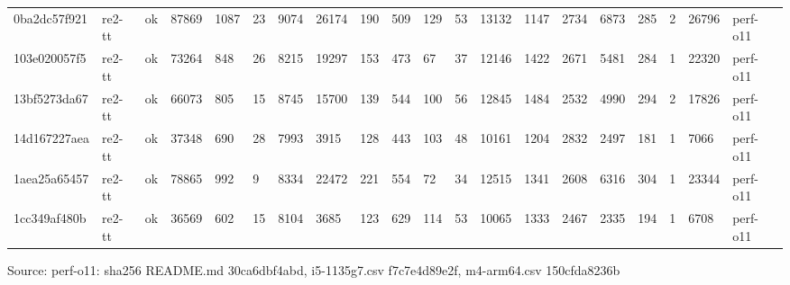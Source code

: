 \begin{table}[t]
\begin{tabular}{llllllllllllllllllll}
0ba2dc57f921 & re2-tt & ok & 87869 & 1087 & 23 & 9074 & 26174 & 190 & 509 & 129 & 53 & 13132 & 1147 & 2734 & 6873 & 285 & 2 & 26796 & perf-o11 \\
103e020057f5 & re2-tt & ok & 73264 & 848 & 26 & 8215 & 19297 & 153 & 473 & 67 & 37 & 12146 & 1422 & 2671 & 5481 & 284 & 1 & 22320 & perf-o11 \\
13bf5273da67 & re2-tt & ok & 66073 & 805 & 15 & 8745 & 15700 & 139 & 544 & 100 & 56 & 12845 & 1484 & 2532 & 4990 & 294 & 2 & 17826 & perf-o11 \\
14d167227aea & re2-tt & ok & 37348 & 690 & 28 & 7993 & 3915 & 128 & 443 & 103 & 48 & 10161 & 1204 & 2832 & 2497 & 181 & 1 & 7066 & perf-o11 \\
1aea25a65457 & re2-tt & ok & 78865 & 992 & 9 & 8334 & 22472 & 221 & 554 & 72 & 34 & 12515 & 1341 & 2608 & 6316 & 304 & 1 & 23344 & perf-o11 \\
1cc349af480b & re2-tt & ok & 36569 & 602 & 15 & 8104 & 3685 & 123 & 629 & 114 & 53 & 10065 & 1333 & 2467 & 2335 & 194 & 1 & 6708 & perf-o11 \\
\hline
\end{tabular}
\par\smallskip\footnotesize
Source: perf-o11: sha256 README.md 30ca6dbf4abd, i5-1135g7.csv f7c7e4d89e2f, m4-arm64.csv 150cfda8236b\\
\end{table}
